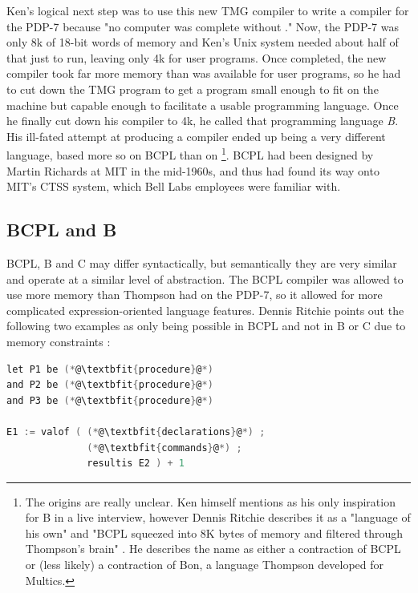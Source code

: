 Ken's logical next step was to use this new TMG compiler to
write a \ftn{} compiler for the PDP-7 because
"no computer was complete without \ftn{}."
Now, the PDP-7 was only 8k of 18-bit words of memory and Ken's Unix system needed
about half of that just to run, leaving only 4k for user programs.
Once completed, the new \ftn{} compiler took far more memory than was available for
user programs, so he had to cut down the TMG program to get a program small enough to
fit on the machine but capable enough to facilitate a usable programming language.
Once he finally cut down his compiler to 4k, he called that programming language \textit{B}.
His ill-fated attempt at producing a \ftn{} compiler ended up being a very different language,
based more so on BCPL than on \ftn{}
\footnote{The origins are really unclear. Ken himself mentions \ftn{} as his only inspiration
	for B in a live interview\cite{kernighan_interviews_thompson_2019},
	however Dennis Ritchie describes it as a "language of his own" and
	"BCPL squeezed into 8K bytes of memory and filtered through Thompson's brain"
	\cite{development_of_c_language_chist_ritchie_1996}.
	He describes the name as either a contraction of BCPL or (less likely) a contraction
	of Bon, a language Thompson developed for Multics.}.
BCPL had been designed by Martin Richards at MIT in the mid-1960s, and thus had found
its way onto MIT's CTSS system, which Bell Labs employees were familiar with.

\subsection{BCPL and B}

BCPL, B and C may differ syntactically, but semantically they are very similar
and operate at a similar level of abstraction.
The BCPL compiler was allowed to use more memory than Thompson had on the PDP-7,
so it allowed for more complicated expression-oriented language features.
Dennis Ritchie points out the following two examples as only being possible
in BCPL and not in B or C due to memory constraints
\cite{development_of_c_language_chist_ritchie_1996}:

\begin{lstlisting}[language=c,frame=single]
let P1 be (*@\textbfit{procedure}@*)
and P2 be (*@\textbfit{procedure}@*)
and P3 be (*@\textbfit{procedure}@*)

E1 := valof ( (*@\textbfit{declarations}@*) ;
              (*@\textbfit{commands}@*) ;
              resultis E2 ) + 1
\end{lstlisting}

